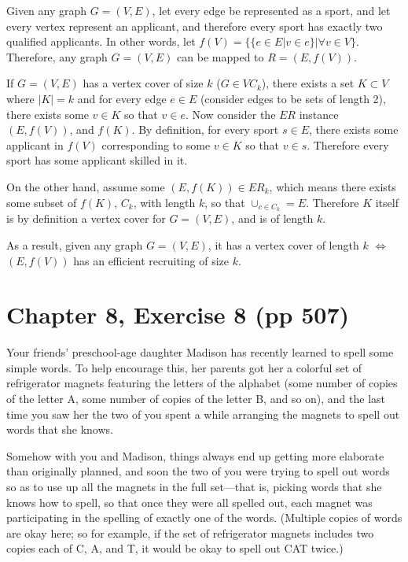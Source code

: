 \documentclass[12pt, letterpaper]{article}
\begin{document}
Given any graph $G = (V, E)$, let every edge be represented as a sport, and let every vertex represent an applicant, and therefore every sport has exactly two qualified applicants.
In other words, let $f(V) = \{ \{ e \in E | v \in e \} | \forall v \in V \}$.
Therefore, any graph $G = (V, E)$ can be mapped to $R=(E, f(V))$.

If $G=(V, E)$ has a vertex cover of size $k$ ($G \in {VC}_k$), there exists a set $K \subset V$ where $|K| = k$ and for every edge $e \in E$ (consider edges to be sets of length 2), there exists some $v \in K$ so that $v \in e$.
Now consider the $ER$ instance $(E, f(V))$, and $f(K)$. By definition, for every sport $s \in E$, there exists some applicant in $f(V)$ corresponding to some $v \in K$ so that $v \in s$. Therefore every sport has some applicant skilled in it.

On the other hand, assume some $(E, f(K)) \in ER_k$, which means there exists some subset of $f(K)$, $C_k$, with length $k$, so that $\cup_{c \in C_k} = E$.
Therefore $K$ itself is by definition a vertex cover for $G=(V, E)$, and is of length $k$.

As a result, given any graph $G=(V, E)$, it has a vertex cover of length $k$ $\Longleftrightarrow{}$ $(E, f(V))$ has an efficient recruiting of size $k$.


\clearpage

\section{Chapter 8, Exercise 8 (pp 507)}
Your friends' preschool-age daughter Madison has recently learned to spell some simple words. 
To help encourage this, her parents got her a colorful set of refrigerator magnets featuring the letters of the alphabet 
(some number of copies of the letter A, some number of copies of the letter B, and so on), and the last time you saw her the two of you spent a while arranging the magnets to spell out words that she knows.

Somehow with you and Madison, things always end up getting more elaborate than originally planned, and soon the two of you were trying to spell out words so as to use up all the magnets in the full set—that is, picking words that she knows how to spell, so that once they were all spelled out, each magnet was participating in the spelling of exactly one of the words. 
(Multiple copies of words are okay here; so for example, if the set of refrigerator magnets includes two copies each of C, A, and T, it would be okay to spell out CAT twice.)
\end{document}
